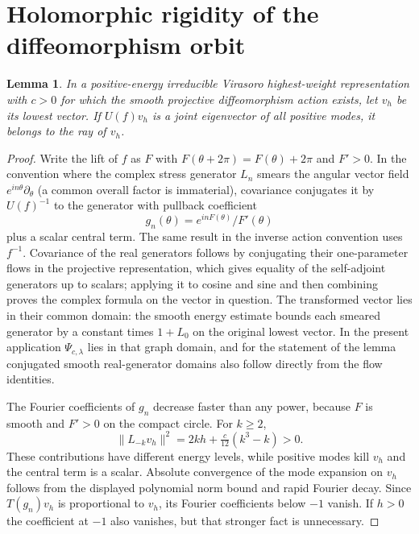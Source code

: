 \documentclass[11pt]{article}
\newtheorem{lemma}{Lemma}
\begin{document}
\section{Holomorphic rigidity of the diffeomorphism orbit}
\begin{lemma}\label{rigidity}
In a positive-energy irreducible Virasoro highest-weight representation with $c>0$ for which the smooth projective diffeomorphism action exists, let $v_h$ be its lowest vector. If $U(f)v_h$ is a joint eigenvector of all positive modes, it belongs to the ray of $v_h$.
\end{lemma}
\begin{proof}
Write the lift of $f$ as $F$ with $F(\theta+2\pi)=F(\theta)+2\pi$ and $F'>0$. In the convention where the complex stress generator $L_n$ smears the angular vector field $e^{in\theta}\partial_\theta$ (a common overall factor is immaterial), covariance conjugates it by $U(f)^{-1}$ to the generator with pullback coefficient
\[
  g_n(\theta)=e^{inF(\theta)}/F'(\theta)
\]
plus a scalar central term. The same result in the inverse action convention uses $f^{-1}$. Covariance of the real generators follows by conjugating their one-parameter flows in the projective representation, which gives equality of the self-adjoint generators up to scalars; applying it to cosine and sine and then combining proves the complex formula on the vector in question. The transformed vector lies in their common domain: the smooth energy estimate bounds each smeared generator by a constant times $1+L_0$ on the original lowest vector. In the present application $\Psi_{c,\lambda}$ lies in that graph domain, and for the statement of the lemma conjugated smooth real-generator domains also follow directly from the flow identities.

The Fourier coefficients of $g_n$ decrease faster than any power, because $F$ is smooth and $F'>0$ on the compact circle. For $k\ge2$,
\[
\|L_{-k}v_h\|^2=2kh+\tfrac{c}{12}(k^3-k)>0.
\]
These contributions have different energy levels, while positive modes kill $v_h$ and the central term is a scalar. Absolute convergence of the mode expansion on $v_h$ follows from the displayed polynomial norm bound and rapid Fourier decay. Since $T(g_n)v_h$ is proportional to $v_h$, its Fourier coefficients below $-1$ vanish. If $h>0$ the coefficient at $-1$ also vanishes, but that stronger fact is unnecessary.


\end{proof}
\end{document}
